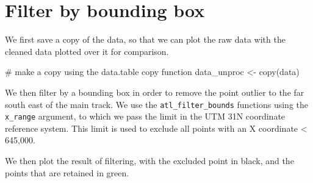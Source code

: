 \documentclass[]{scrreprt}
\newenvironment{Shaded}{}{}
\newcommand{\CommentTok}[1]{\textcolor[rgb]{0.00,0.50,0.00}{#1}}
\newcommand{\DataTypeTok}[1]{#1}
\newcommand{\DecValTok}[1]{#1}
\newcommand{\KeywordTok}[1]{\textcolor[rgb]{0.00,0.00,1.00}{#1}}
\newcommand{\NormalTok}[1]{#1}
\newcommand{\OperatorTok}[1]{#1}
\newcommand{\OtherTok}[1]{\textcolor[rgb]{1.00,0.25,0.00}{#1}}
\newcommand{\StringTok}[1]{\textcolor[rgb]{0.00,0.50,0.50}{#1}}
\begin{document}
\hypertarget{filter-by-bounding-box}{%
\section{Filter by bounding box}\label{filter-by-bounding-box}}

We first save a copy of the data, so that we can plot the raw data with the cleaned data plotted over it for comparison.

\begin{Shaded}
\begin{Highlighting}[]
\CommentTok{# make a copy using the data.table copy function}
\NormalTok{data_unproc <-}\StringTok{ }\KeywordTok{copy}\NormalTok{(data)}
\end{Highlighting}
\end{Shaded}

We then filter by a bounding box in order to remove the point outlier to the far south east of the main track. We use the \texttt{atl\_filter\_bounds} functions using the \texttt{x\_range} argument, to which we pass the limit in the UTM 31N coordinate reference system.
This limit is used to exclude all points with an X coordinate \textless{} 645,000.

We then plot the result of filtering, with the excluded point in black, and the points that are retained in green.

\begin{Shaded}
\end{Shaded}
\end{document}

